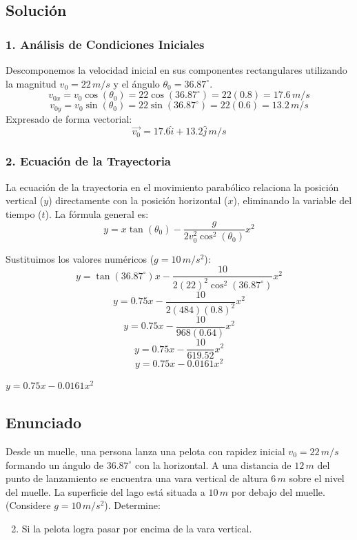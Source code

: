 \documentclass[12pt, a4paper]{article}
\begin{document}
\subsection*{Solución}

\subsubsection*{1. Análisis de Condiciones Iniciales}
Descomponemos la velocidad inicial en sus componentes rectangulares utilizando la magnitud $v_0 = 22 \, \si{m/s}$ y el ángulo $\theta_0 = 36.87^\circ$.
$$ v_{0x} = v_0 \cos(\theta_0) = 22 \cos(36.87^\circ) = 22(0.8) = 17.6 \, \si{m/s} $$
$$ v_{0y} = v_0 \sin(\theta_0) = 22 \sin(36.87^\circ) = 22(0.6) = 13.2 \, \si{m/s} $$
Expresado de forma vectorial:
$$ \vec{v_0} = 17.6\hat{i} + 13.2\hat{j} \, \si{m/s} $$

\subsubsection*{2. Ecuación de la Trayectoria}
La ecuación de la trayectoria en el movimiento parabólico relaciona la posición vertical ($y$) directamente con la posición horizontal ($x$), eliminando la variable del tiempo ($t$). La fórmula general es:
$$ y = x \tan(\theta_0) - \frac{g}{2 v_0^2 \cos^2(\theta_0)} x^2 $$

Sustituimos los valores numéricos ($g = 10 \, \si{m/s^2}$):
$$ y = \tan(36.87^\circ) x - \frac{10}{2 (22)^2 \cos^2(36.87^\circ)} x^2 $$
$$ y = 0.75 x - \frac{10}{2 (484) (0.8)^2} x^2 $$
$$ y = 0.75 x - \frac{10}{968 (0.64)} x^2 $$
$$ y = 0.75 x - \frac{10}{619.52} x^2 $$
$$ y = 0.75 x - 0.0161 x^2 $$

\begin{tcolorbox}[colback=green!5!white, colframe=green!50!black, title=Respuesta Final]
\centering $y = 0.75 x - 0.0161 x^2$
\end{tcolorbox}

\newpage

\subsection*{Enunciado}
Desde un muelle, una persona lanza una pelota con rapidez inicial $v_0 = 22 \, \si{m/s}$ formando un ángulo de $36.87^\circ$ con la horizontal. A una distancia de $12 \, \si{m}$ del punto de lanzamiento se encuentra una vara vertical de altura $6 \, \si{m}$ sobre el nivel del muelle. La superficie del lago está situada a $10 \, \si{m}$ por debajo del muelle. (Considere $g = 10 \, \si{m/s^2}$). Determine:
\begin{enumerate}[label=\alph*)]
    \setcounter{enumi}{1}
    \item Si la pelota logra pasar por encima de la vara vertical.
\end{enumerate}
\end{document}
